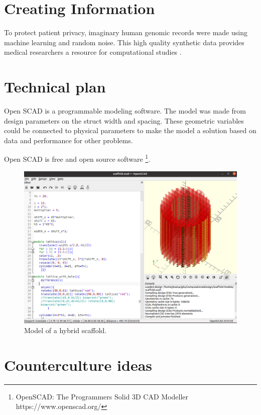 \documentclass[a4paper,11pt]{article}
\begin{document}
\section{Creating Information}


To protect patient privacy, imaginary human genomic records were made using machine learning and random noise. This high quality synthetic data provides medical researchers a resource for computational studies \cite{yelmen2021creating}.  

\section{Technical plan}

Open SCAD is a programmable modeling software. The model was made from design parameters on the struct width and spacing. These geometric variables could be connected to physical parameters to make the model a solution based on data and performance for other problems. 

Open SCAD is free and open source software \footnote{
OpenSCAD: The Programmers Solid 3D CAD Modeller https://www.openscad.org/}.

\begin{figure}
  \includegraphics[width=\linewidth]{day05.png}
  \caption{Model of a hybrid scaffold.}
  \label{fig:boat1}
\end{figure}

\section{Counterculture ideas}
\end{document}
